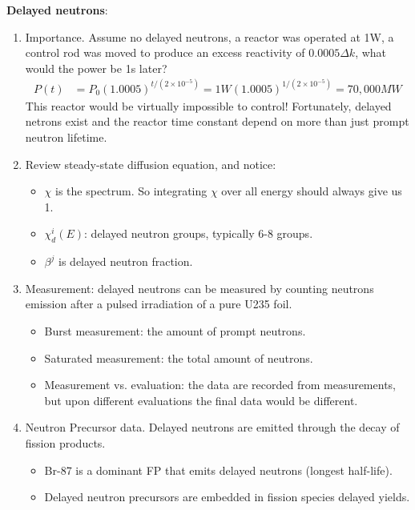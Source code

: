 \documentclass{school-22.211-notes}
\begin{document}
\vspace{0.5cm}
\textbf{Delayed neutrons}:
\begin{enumerate}
\item Importance. Assume no delayed neutrons, a reactor was operated at 1W, a control rod was moved to produce an excess reactivity of $0.0005 \Delta k$, what would the power be 1s later? 
\begin{align}
P(t) &= P_0 (1.0005)^{t/(2\times 10^{-5})} = 1 W (1.0005)^{1/(2\times 10^{-5})} = 70,000 MW 
\end{align}
This reactor would be virtually impossible to control! Fortunately, delayed netrons exist and the reactor time constant depend on more than just prompt neutron lifetime. 

\item Review steady-state diffusion equation, and notice: 
  \begin{itemize}
  \item $\chi$ is the spectrum. So integrating $\chi$ over all energy should always give us 1. 
  \item $\chi_d^i (E)$: delayed neutron groups, typically 6-8 groups. 
  \item $\beta^j$ is delayed neutron fraction. 
  \end{itemize}

\item Measurement: delayed neutrons can be measured by counting neutrons emission after a pulsed irradiation of a pure U235 foil. 
  \begin{itemize}
  \item Burst measurement: the amount of prompt neutrons.
  \item Saturated measurement: the total amount of neutrons. 
  \item Measurement vs. evaluation: the data are recorded from measurements, but upon different evaluations the final data would be different. 
  \end{itemize}

\item Neutron Precursor data. Delayed neutrons are emitted through the decay of fission products. 
  \begin{itemize}
  \item Br-87 is a dominant FP that emits delayed neutrons (longest half-life). 
  \item Delayed neutron precursors are embedded in fission species delayed yields. 
    \end{itemize}


\end{enumerate}
\end{document}
